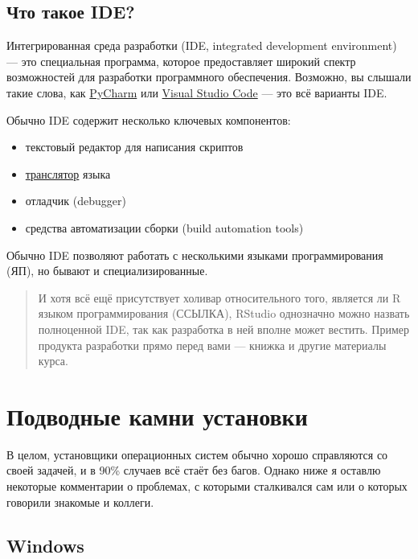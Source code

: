 \documentclass[
  letterpaper,
  DIV=11,
  numbers=noendperiod]{scrreprt}
\providecommand{\tightlist}{%
  \setlength{\itemsep}{0pt}\setlength{\parskip}{0pt}}\usepackage{longtable,booktabs,array}
\theoremstyle{definition}
\theoremstyle{remark}
\begin{document}
\subsection{Что такое IDE?}\label{rbasics-what-is-ide}

Интегрированная среда разработки (IDE, integrated development
environment) --- это специальная программа, которое предоставляет
широкий спектр возможностей для разработки программного обеспечения.
Возможно, вы слышали такие слова, как
\href{https://www.jetbrains.com/ru-ru/pycharm/}{PyCharm} или
\href{https://code.visualstudio.com/}{Visual Studio Code} --- это всё
варианты IDE.

Обычно IDE содержит несколько ключевых компонентов:

\begin{itemize}
\tightlist
\item
  текстовый редактор для написания скриптов
\item
  \hyperref[appendix_proglang]{транслятор} языка
\item
  отладчик (debugger)
\item
  средства автоматизации сборки (build automation tools)
\end{itemize}

Обычно IDE позволяют работать с несколькими языками программирования
(ЯП), но бывают и специализированные.

\begin{quote}
И хотя всё ещё присутствует холивар относительного того, является ли R
языком программирования (ССЫЛКА), RStudio однозначно можно назвать
полноценной IDE, так как разработка в ней вполне может вестить. Пример
продукта разработки прямо перед вами --- книжка и другие материалы
курса.
\end{quote}

\section{Подводные камни установки}\label{rbasics-installation-problems}

В целом, установщики операционных систем обычно хорошо справляются со
своей задачей, и в 90\% случаев всё стаёт без багов. Однако ниже я
оставлю некоторые комментарии о проблемах, с которыми сталкивался сам
или о которых говорили знакомые и коллеги.

\subsection{Windows}\label{rbasics-installation-problems-win}
\end{document}
